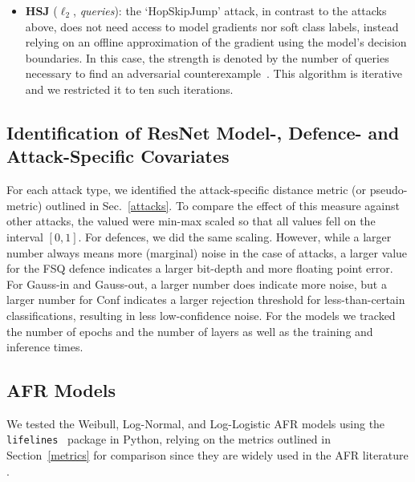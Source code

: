 \begin{itemize}
    \item \textbf{HSJ} ($\ell_2$, \textit{queries}): the `HopSkipJump' attack, in contrast to the attacks above, does not need access to model gradients nor soft class labels, instead relying on an offline approximation of the gradient using the model's decision boundaries. In this case, the strength is denoted by the number of queries necessary to find an adversarial counterexample~\citep{hopskipjump}. This algorithm is iterative and we restricted it to ten such iterations.
\end{itemize}




\subsection{Identification of ResNet Model-, Defence- and Attack-Specific Covariates}
For each attack type, we identified the attack-specific distance metric (or pseudo-metric) outlined in Sec.~\ref{attacks}. To compare the effect of this measure against other attacks, the valued were min-max scaled so that all values fell on the interval $[0,1]$. For defences, we did the same scaling. However, while a larger number always means more (marginal) noise in the case of attacks, a larger value for the FSQ defence indicates a larger bit-depth and more floating point error. For Gauss-in and Gauss-out, a larger number does indicate more noise, but a larger number for Conf indicates a larger rejection threshold for less-than-certain classifications, resulting in less low-confidence noise. For the models we tracked the number of epochs and the number of layers as well as the training and inference times. 


\subsection{AFR Models}
We tested the Weibull, Log-Normal, and Log-Logistic AFR models using the \texttt{lifelines}~\citep{lifelines} package in Python, relying on the metrics outlined in Section~\ref{metrics} for comparison since they are widely used in the AFR literature \citep{aft_models}.
